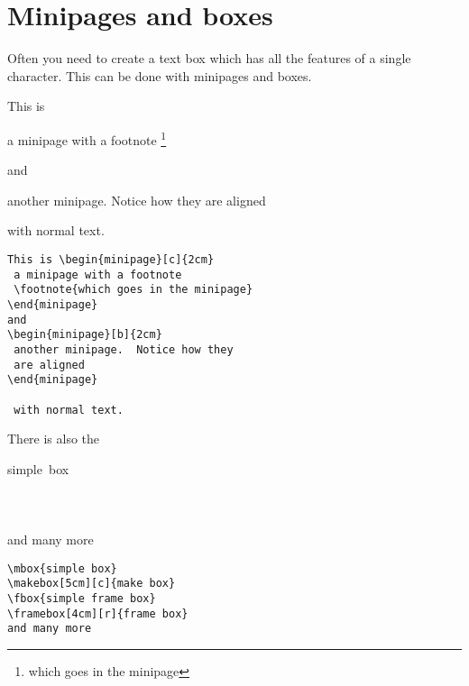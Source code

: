 \documentclass[12pt, a4paper]{book}
\begin{document}
\section*{Minipages and boxes}
Often you need to create a text box which has all the features of a single character.  This can be done with minipages and boxes.
\begin{center}
\begin{minipage}[t]{7cm}
This is \begin{minipage}[c]{2cm}
 a minipage with a footnote
 \footnote{which goes in the minipage}
\end{minipage}
and 
\begin{minipage}[b]{2cm}
 another minipage.  Notice how they
 are aligned
\end{minipage}

 with normal text.
\end{minipage}
\hspace{0.5cm}
\begin{minipage}[t]{7cm}
\begin{verbatim}
This is \begin{minipage}[c]{2cm}
 a minipage with a footnote
 \footnote{which goes in the minipage}
\end{minipage}
and 
\begin{minipage}[b]{2cm}
 another minipage.  Notice how they
 are aligned
\end{minipage}

 with normal text.
\end{verbatim}
\end{minipage}
\end{center}

There is also the
\begin{center}
\begin{minipage}[t]{7cm}
\mbox{simple box} \\
 \\
 \\
 \\
and many more
\end{minipage}
\hspace{0.5cm}
\begin{minipage}[t]{7cm}
\begin{verbatim}
\mbox{simple box}
\makebox[5cm][c]{make box}
\fbox{simple frame box}
\framebox[4cm][r]{frame box}
and many more
\end{verbatim}
\end{minipage}
\end{center}
\end{document}
